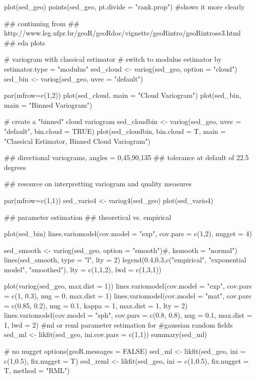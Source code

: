 \documentclass[a4paper]{article}
\begin{document}
plot(sed_geo)
points(sed_geo, pt.divide = "rank.prop")
#shows it more clearly

## continuing from
## http://www.leg.ufpr.br/geoR/geoRdoc/vignette/geoRintro/geoRintrose3.html
## eda plots


# variogram with classical estimator
# switch to modulus estimator by estimator.type = "modulus"
sed_cloud <- variog(sed_geo, option = "cloud")
sed_bin <- variog(sed_geo, uvec = "default")

par(mfrow=c(1,2))
plot(sed_cloud, main = "Cloud Variogram")
plot(sed_bin, main = "Binned Variogram")

# create a "binned" cloud variogram
sed_cloudbin <- variog(sed_geo, uvec = "default",
                       bin.cloud = TRUE)
plot(sed_cloudbin, bin.cloud = T, main = 
       "Classical Estimator, Binned Cloud Variogram")

## directional variograms, angles = 0,45,90,135
## tolerance at default of 22.5 degrees

## resource on interpretting variogram and quality measures

par(mfrow=c(1,1))
sed_vario4 <- variog4(sed_geo)
plot(sed_vario4)

## parameter estimation
## theoretical vs. empirical

plot(sed_bin)
lines.variomodel(cov.model = "exp", cov.pars = c(1,2),
                 nugget = 4)

sed_smooth <- variog(sed_geo, option = "smooth")#, ksmooth = "normal")
lines(sed_smooth, type = "l", lty = 2)
legend(0.4,0.3,c("empirical", "exponential model", 
                 "smoothed"), lty = c(1,1,2), lwd = c(1,3,1))


plot(variog(sed_geo, max.dist = 1)) 
lines.variomodel(cov.model = "exp", cov.pars = c(1, 
                                                   0.3), nug = 0, max.dist = 1) 
lines.variomodel(cov.model = "mat", cov.pars = c(0.85, 
                                                     0.2), nug = 0.1, kappa = 1, max.dist = 1, 
                     lty = 2) 
lines.variomodel(cov.model = "sph", cov.pars = c(0.8, 
                                                      0.8), nug = 0.1, max.dist = 1, lwd = 2)
#ml or reml parameter estimation for
#gaussian random fields
sed_ml <- likfit(sed_geo, ini.cov.pars = c(1,1))
summary(sed_ml)

# no nugget
options(geoR.messages = FALSE)
sed_ml <- likfit(sed_geo, ini = c(1,0.5),
                  fix.nugget = T)
sed_reml <- likfit(sed_geo, ini = c(1,0.5),
                   fix.nugget = T,
                   method = "RML")
\end{document}
